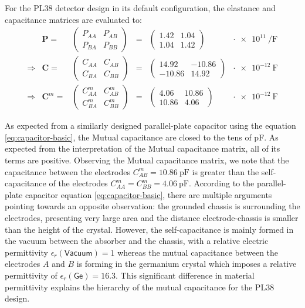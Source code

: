 For the PL38 detector design in its default configuration, the elastance and capacitance matrices are evaluated to:
\begin{equation} 
\label{eq:planar38-matrix-evaluation}
\begin{array}{rrccclc}
 & \bm{P} = &
 \begin{pmatrix}
P_{AA} & P_{AB} \\ 
P_{BA} & P_{BB}
\end{pmatrix}
&=&
\begin{pmatrix}
1.42 & 1.04 \\
1.04 & 1.42
\end{pmatrix}
& \cdot \SI{e11}{\per\farad} \\
\Rightarrow & \bm{C} = &
\begin{pmatrix}
C_{AA} & C_{AB} \\ 
C_{BA} & C_{BB}
\end{pmatrix}
&=&
\begin{pmatrix}
14.92 & -10.86 \\
-10.86 & 14.92
\end{pmatrix}
& \cdot \SI{e-12}{\farad} \\
\Rightarrow & \bm{C}^m = &
\begin{pmatrix}
C_{AA}^m & C_{AB}^m \\ 
C_{BA}^m & C_{BB}^m
\end{pmatrix}
&=&
\begin{pmatrix}
4.06 & 10.86 \\
10.86 & 4.06
\end{pmatrix}
& \cdot \SI{e-12}{\farad}
\end{array}
\end{equation}
 
As expected from a similarly designed parallel-plate capacitor using the equation \ref{eq:capacitor-basic}, the Mutual capacitance are closed to the tens of \si{\pico\farad}. As expected from the interpretation of the Mutual capacitance matrix, all of its terms are positive. Observing the Mutual capacitance matrix, we note that the capacitance between the electrodes $C_{AB}^m=\SI{10.86}{\pico\farad}$ is greater than the self-capacitance of the electrodes $C_{AA}^m = C_{BB}^m = \SI{4.06}{\pico\farad}$. According to the parallel-plate capacitor equation \ref{eq:capacitor-basic}, there are multiple arguments pointing towards an opposite observation: the grounded chassis is surrounding the electrodes, presenting very large area and the distance electrode-chassis is smaller than the height of the crystal. However, the self-capacitance is mainly formed in the vacuum between the absorber and the chassis, with a relative electric permittivity $\epsilon_r(\textsf{Vacuum})=1$ whereas the mutual capacitance between the electrodes $A$ and $B$ is forming in the germanium crystal which imposes a relative permittivity of $\epsilon_r(\textsf{Ge})=16.3$. This  significant difference in material permittivity explains the hierarchy of the mutual capacitance for the PL38 design.

